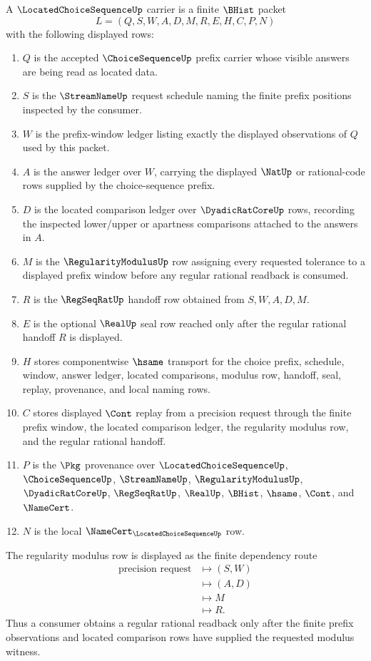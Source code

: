 \begin{definition}
\label{def:located-choice-sequence-carrier}
A $\LocatedChoiceSequenceUp$ carrier is a finite $\BHist$ packet
$$
L=(Q,S,W,A,D,M,R,E,H,C,P,N)
$$
with the following displayed rows:
\begin{enumerate}
\item $Q$ is the accepted $\ChoiceSequenceUp$ prefix carrier whose visible answers are being read as located data.
\item $S$ is the $\StreamNameUp$ request schedule naming the finite prefix positions inspected by the consumer.
\item $W$ is the prefix-window ledger listing exactly the displayed observations of $Q$ used by this packet.
\item $A$ is the answer ledger over $W$, carrying the displayed $\NatUp$ or rational-code rows supplied by the choice-sequence prefix.
\item $D$ is the located comparison ledger over $\DyadicRatCoreUp$ rows, recording the inspected lower/upper or apartness comparisons attached to the answers in $A$.
\item $M$ is the $\RegularityModulusUp$ row assigning every requested tolerance to a displayed prefix window before any regular rational readback is consumed.
\item $R$ is the $\RegSeqRatUp$ handoff row obtained from $S,W,A,D,M$.
\item $E$ is the optional $\RealUp$ seal row reached only after the regular rational handoff $R$ is displayed.
\item $H$ stores componentwise $\hsame$ transport for the choice prefix, schedule, window, answer ledger, located comparisons, modulus row, handoff, seal, replay, provenance, and local naming rows.
\item $C$ stores displayed $\Cont$ replay from a precision request through the finite prefix window, the located comparison ledger, the regularity modulus row, and the regular rational handoff.
\item $P$ is the $\Pkg$ provenance over $\LocatedChoiceSequenceUp$, $\ChoiceSequenceUp$, $\StreamNameUp$, $\RegularityModulusUp$, $\DyadicRatCoreUp$, $\RegSeqRatUp$, $\RealUp$, $\BHist$, $\hsame$, $\Cont$, and $\NameCert$.
\item $N$ is the local $\NameCert_{\LocatedChoiceSequenceUp}$ row.
\end{enumerate}
The regularity modulus row is displayed as the finite dependency route
$$
\begin{aligned}
\text{precision request}
&\longmapsto (S,W)\\
&\longmapsto (A,D)\\
&\longmapsto M\\
&\longmapsto R .
\end{aligned}
$$
Thus a consumer obtains a regular rational readback only after the finite prefix observations and located comparison rows have supplied the requested modulus witness.
\end{definition}

